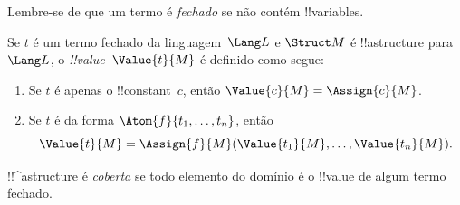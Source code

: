 \documentclass[../../../include/open-logic-section]{subfiles}
\begin{document}


\begin{explain}
Lembre-se de que um termo é \emph{fechado} se não contém !!{variable}s.
\end{explain}

\begin{defn}
Se $t$ é um termo fechado da linguagem~$\Lang L$ e $\Struct M$ é
!!a{structure} para~$\Lang L$, o \emph{!!{value}}~$\Value{t}{M}$ é
definido como segue:
\begin{enumerate}
\item Se $t$ é apenas o !!{constant}~$c$, então $\Value{c}{M} = \Assign{c}{M}$.
\item Se $t$ é da forma $\Atom{f}{t_1, \ldots, t_n}$, então
  \[
  \Value{t}{M} = \Assign{f}{M}(\Value{t_1}{M}, \ldots,
  \Value{t_n}{M}).
  \]
\end{enumerate}
\end{defn}

\begin{defn}
!!^a{structure} é \emph{coberta} se todo elemento do domínio é o
!!{value} de algum termo fechado.
\end{defn}
\end{document}
